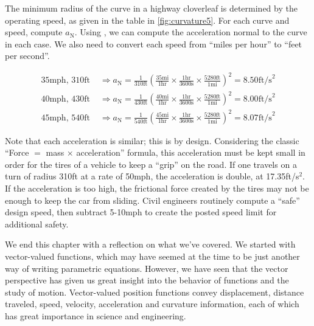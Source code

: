 \begin{example}\label{ex_curvature5}
The minimum radius of the curve in a highway cloverleaf is determined by the operating speed, as given in the table in \autoref{fig:curvature5}. For each curve and speed, compute $a_{\mathrm{N}}$.
\solution
{}
Using , we can compute the acceleration normal to the curve in each case. We also need to convert each speed from ``miles per hour'' to ``feet per second''.

\begin{align*}
 \text{35mph, 310ft }
 &\Rightarrow a_{\mathrm{N}}
 =\frac1{310\text{ft}}\left(\frac{35\text{mi}}{1\text{hr}}\times\frac{1\text{hr}}{3600\text{s}}\times\frac{5280\text{ft}}{1\text{mi}}\right)^2
 =8.50\text{ft/s}^2\\
 \text{40mph, 430ft }
 &\Rightarrow a_{\mathrm{N}}
 =\frac1{430\text{ft}}\left(\frac{40\text{mi}}{1\text{hr}}\times\frac{1\text{hr}}{3600\text{s}}\times\frac{5280\text{ft}}{1\text{mi}}\right)^2
 =8.00\text{ft/s}^2\\
 \text{45mph, 540ft }
 &\Rightarrow a_{\mathrm{N}}
 =\frac1{540\text{ft}}\left(\frac{45\text{mi}}{1\text{hr}}\times\frac{1\text{hr}}{3600\text{s}}\times\frac{5280\text{ft}}{1\text{mi}}\right)^2
 =8.07\text{ft/s}^2
\end{align*}

Note that each acceleration is similar; this is by design. Considering the classic ``Force $=$ mass $\times$ acceleration'' formula, this acceleration must be kept small in order for the tires of a vehicle to keep a ``grip'' on the road. If one travels on a turn of radius 310ft at a rate of 50mph, the acceleration is double, at 17.35ft/s$^2$. If the acceleration is too high, the frictional force created by the tires may not be enough to keep the car from sliding. Civil engineers routinely compute a ``safe'' design speed, then subtract 5-10mph to create the posted speed limit for additional safety.
\end{example}


We end this chapter with a reflection on what we've covered. We started with vector-valued functions, which may have seemed at the time to be just another way of writing parametric equations. However, we have seen that the vector perspective has given us great insight into the behavior of functions and the study of motion. Vector-valued position functions convey displacement, distance traveled, speed, velocity, acceleration and curvature information, each of which has great importance in science and engineering.

